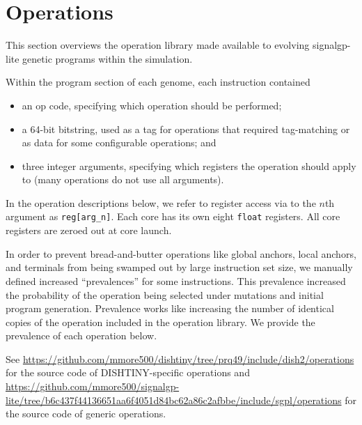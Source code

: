 \section{Operations}

\newcommand{\opdef}[2]{
    \begin{tabular}{|
        >{\columncolor[HTML]{C0C0C0}}l |l|}
        \hline
        Prevalence & #1 \\ \hline
        Num Args   & #2 \\ \hline
    \end{tabular}
}

This section overviews the operation library made available to evolving signalgp-lite genetic programs within the simulation.

Within the program section of each genome, each instruction contained 
\begin{itemize}
\item an op code, specifying which operation should be performed;
\item a 64-bit bitstring, used as a tag for operations that required tag-matching or as data for some configurable operations; and
\item three integer arguments, specifying which registers the operation should apply to (many operations do not use all arguments).
\end{itemize}

In the operation descriptions below, we refer to register access via to the $n$th argument as \texttt{reg[arg\_n]}.
Each core has its own eight \texttt{float} registers.
All core registers are zeroed out at core launch.

In order to prevent bread-and-butter operations like global anchors, local anchors, and terminals from being swamped out by large instruction set size, we manually defined increased ``prevalences'' for some instructions.
This prevalence increased the probability of the operation being selected under mutations and initial program generation.
Prevalence works like increasing the number of identical copies of the operation included in the operation library.
We provide the prevalence of each operation below.

See \url{https://github.com/mmore500/dishtiny/tree/prq49/include/dish2/operations} for the source code of DISHTINY-specific operations and \url{https://github.com/mmore500/signalgp-lite/tree/b6c437f44136651aa6f4051d84bc62a86c2afbbe/include/sgpl/operations} for the source code of generic operations.

